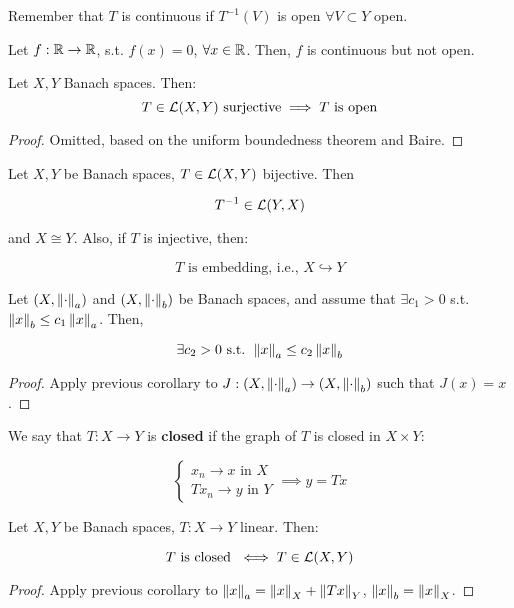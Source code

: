 \begin{fremark}
    Remember that $T$ is continuous if $T^{-1}(V)$ is open $\forall V \subset Y$ open.
\end{fremark}

\begin{example}
    Let $f: \mathbb{R} \to \mathbb{R}$, s.t. $f(x) = 0$, $\forall x \in \mathbb{R}$. Then, 
    $f$ is continuous but not open.
\end{example}

\vspace{1em}

\begin{ftheorem}
    Let $X, Y$ Banach spaces. Then:
    $$T \in \mathcal{L}(X, Y) \text{ surjective} \implies T \text{ is open}$$
\end{ftheorem}

\begin{proof}
    Omitted, based on the uniform boundedness theorem and Baire.
\end{proof}

\begin{fcorollary}
    Let $X, Y$ be Banach spaces, $T\in \mathcal{L}(X, Y)$ bijective. Then

    $$T^{-1} \in \mathcal{L}(Y, X)$$

    and $X \cong Y$. Also, if $T$ is injective, then:

    $$T \text{ is embedding, i.e., } X \hookrightarrow Y$$
\end{fcorollary}

\begin{fcorollary}
    Let $(X, \left\|\cdot\right\|_a)$ and $(X, \left\|\cdot\right\|_b)$ be Banach spaces, and
    assume that $\exists c_1 > 0$ s.t. $\left\|x\right\|_b \leq c_1 \left\|x\right\|_a$.
    Then,
    
    $$\exists c_2 > 0 \text{ s.t. } \left\|x\right\|_a \leq c_2 \left\|x\right\|_b$$
\end{fcorollary}

\begin{proof}
    Apply previous corollary to $J: (X, \left\|\cdot\right\|_a) \to (X, \left\|\cdot\right\|_b)$
    such that $J(x) = x$.
\end{proof}

\begin{fdefinition}
    We say that $T: X \to Y$ is \textbf{closed} if the graph of $T$ is closed in $X \times Y$:

    $$\begin{cases}
        x_n \to x \text{ in } X\\
        Tx_n \to y \text{ in } Y
    \end{cases} \implies y = Tx$$
\end{fdefinition}

\begin{ftheorem}
    Let $X, Y$ be Banach spaces, $T: X \to Y$ linear. Then:

    $$T \text{ is closed } \iff T \in \mathcal{L}(X, Y)$$
\end{ftheorem}

\begin{proof}
    Apply previous corollary to $\left\|x\right\|_a = \left\|x\right\|_X + \left\|Tx\right\|_Y$, 
    $\left\|x\right\|_b = \left\|x\right\|_X$.
\end{proof}

